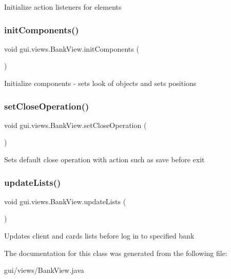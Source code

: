 Initialize action listeners for elements \mbox{\label{classgui_1_1views_1_1_bank_view_a01f3aef7981cc38cbbde788cf508bb3e}} 
\subsubsection{\texorpdfstring{init\+Components()}{initComponents()}}
{\footnotesize\ttfamily void gui.\+views.\+Bank\+View.\+init\+Components (\begin{DoxyParamCaption}{ }\end{DoxyParamCaption})\hspace{0.3cm}{\ttfamily [inline]}}

Initialize components -\/ sets look of objects and sets positions \mbox{\label{classgui_1_1views_1_1_bank_view_a60c0ec356e0a071e0a7c36b9aa9a7e55}} 
\subsubsection{\texorpdfstring{set\+Close\+Operation()}{setCloseOperation()}}
{\footnotesize\ttfamily void gui.\+views.\+Bank\+View.\+set\+Close\+Operation (\begin{DoxyParamCaption}{ }\end{DoxyParamCaption})\hspace{0.3cm}{\ttfamily [inline]}}

Sets default close operation with action such as save before exit \mbox{\label{classgui_1_1views_1_1_bank_view_a01f6403f48d1ba9efd3bd9486170f68f}} 
\subsubsection{\texorpdfstring{update\+Lists()}{updateLists()}}
{\footnotesize\ttfamily void gui.\+views.\+Bank\+View.\+update\+Lists (\begin{DoxyParamCaption}{ }\end{DoxyParamCaption})\hspace{0.3cm}{\ttfamily [inline]}}

Updates client and cards lists before log in to specified bank 

The documentation for this class was generated from the following file\+:\begin{DoxyCompactItemize}
\item 
gui/views/Bank\+View.\+java\end{DoxyCompactItemize}
